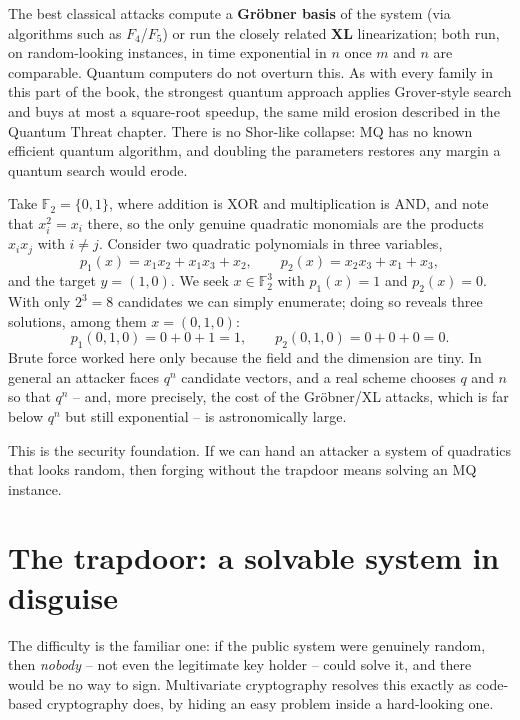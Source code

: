 The best classical attacks compute a \textbf{Gr\"obner basis} of the system (via algorithms such as $F_4$/$F_5$) or run the closely related \textbf{XL} linearization; both run, on random-looking instances, in time exponential in $n$ once $m$ and $n$ are comparable. Quantum computers do not overturn this. As with every family in this part of the book, the strongest quantum approach applies Grover-style search and buys at most a square-root speedup, the same mild erosion described in the Quantum Threat chapter. There is no Shor-like collapse: MQ has no known efficient quantum algorithm, and doubling the parameters restores any margin a quantum search would erode.

\begin{example}
Take $\mathbb{F}_2 = \{0,1\}$, where addition is XOR and multiplication is AND, and note that $x_i^2 = x_i$ there, so the only genuine quadratic monomials are the products $x_i x_j$ with $i \neq j$. Consider two quadratic polynomials in three variables,
\[
p_1(x) = x_1 x_2 + x_1 x_3 + x_2 , \qquad
p_2(x) = x_2 x_3 + x_1 + x_3 ,
\]
and the target $y = (1,0)$. We seek $x \in \mathbb{F}_2^3$ with $p_1(x) = 1$ and $p_2(x) = 0$. With only $2^3 = 8$ candidates we can simply enumerate; doing so reveals three solutions, among them $x = (0,1,0)$:
\[
p_1(0,1,0) = 0 + 0 + 1 = 1 , \qquad p_2(0,1,0) = 0 + 0 + 0 = 0 .
\]
Brute force worked here only because the field and the dimension are tiny. In general an attacker faces $q^n$ candidate vectors, and a real scheme chooses $q$ and $n$ so that $q^n$ -- and, more precisely, the cost of the Gr\"obner/XL attacks, which is far below $q^n$ but still exponential -- is astronomically large.
\end{example}

This is the security foundation. If we can hand an attacker a system of quadratics that looks random, then forging without the trapdoor means solving an MQ instance.

\section{The trapdoor: a solvable system in disguise}

The difficulty is the familiar one: if the public system were genuinely random, then \emph{nobody} -- not even the legitimate key holder -- could solve it, and there would be no way to sign. Multivariate cryptography resolves this exactly as code-based cryptography does, by hiding an easy problem inside a hard-looking one.

